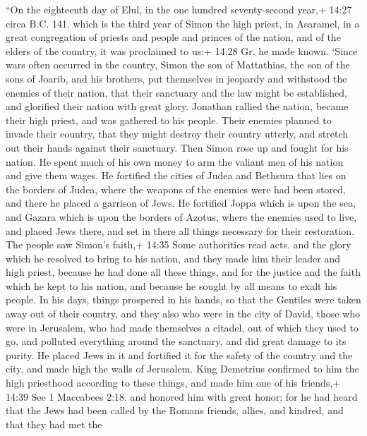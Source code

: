 ``On the eighteenth day of Elul, in the one hundred seventy-second
year,+ 14:27 circa B.C. 141. which is the third year of Simon the high
priest,  in Asaramel, in a great congregation of priests
and people and princes of the nation, and of the elders of the country,
it was proclaimed to us:+ 14:28 Gr. he made known.  `Since
wars often occurred in the country, Simon the son of Mattathias, the son
of the sons of Joarib, and his brothers, put themselves in jeopardy and
withstood the enemies of their nation, that their sanctuary and the law
might be established, and glorified their nation with great glory.
 Jonathan rallied the nation, became their high priest, and
was gathered to his people.  Their enemies planned to
invade their country, that they might destroy their country utterly, and
stretch out their hands against their sanctuary.  Then
Simon rose up and fought for his nation. He spent much of his own money
to arm the valiant men of his nation and give them wages. 
He fortified the cities of Judea and Bethsura that lies on the borders
of Judea, where the weapons of the enemies were had been stored, and
there he placed a garrison of Jews.  He fortified Joppa
which is upon the sea, and Gazara which is upon the borders of Azotus,
where the enemies used to live, and placed Jews there, and set in there
all things necessary for their restoration.  The people saw
Simon's faith,+ 14:35 Some authorities read acts. and the glory which he
resolved to bring to his nation, and they made him their leader and high
priest, because he had done all these things, and for the justice and
the faith which he kept to his nation, and because he sought by all
means to exalt his people.  In his days, things prospered
in his hands, so that the Gentiles were taken away out of their country,
and they also who were in the city of David, those who were in
Jerusalem, who had made themselves a citadel, out of which they used to
go, and polluted everything around the sanctuary, and did great damage
to its purity.  He placed Jews in it and fortified it for
the safety of the country and the city, and made high the walls of
Jerusalem.  King Demetrius confirmed to him the high
priesthood according to these things,  and made him one of
his friends,+ 14:39 See 1 Maccabees 2:18. and honored him with great
honor;  for he had heard that the Jews had been called by
the Romans friends, allies, and kindred, and that they had met the
